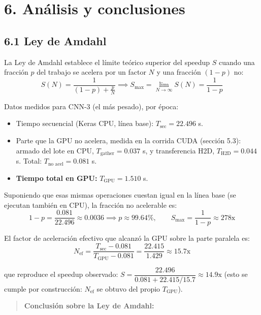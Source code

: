 \documentclass[
  11pt,
]{article}
\providecommand{\tightlist}{%
  \setlength{\itemsep}{0pt}\setlength{\parskip}{0pt}}
\begin{document}
\clearpage
\section{6. Análisis y conclusiones}\label{anuxe1lisis-riguroso-y-conclusiones-paso-6}

\subsection{6.1 Ley de Amdahl}\label{anuxe1lisis-mediante-la-ley-de-amdahl}

La Ley de Amdahl establece el límite teórico superior del
speedup \(S\) cuando una fracción \(p\) del trabajo se
acelera por un factor \(N\) y una fracción \((1 - p)\) no:
\[S(N) = \frac{1}{(1 - p) + \frac{p}{N}} \implies S_{\max} = \lim_{N \to \infty} S(N) = \frac{1}{1 - p}\]

Datos medidos para CNN-3 (el más pesado), por época:

\begin{itemize}
\tightlist
\item
  Tiempo secuencial (Keras CPU, línea base):
  \(T_{\text{sec}} = 22.496\) s.
\item
  Parte que la GPU no acelera, medida en la corrida
  CUDA (sección 5.3): armado del lote en CPU,
  \(T_{\text{gather}} = 0.037\) s, y transferencia H2D,
  \(T_{\text{H2D}} = 0.044\) s. Total:
  \(T_{\text{no acel}} = 0.081\) s.
\item
  \textbf{Tiempo total en GPU:} \(T_{\text{GPU}} = 1.510\)
  s.
\end{itemize}

Suponiendo que esas mismas operaciones cuestan igual en la
línea base (se ejecutan también en CPU), la fracción no
acelerable es:
\[1 - p = \frac{0.081}{22.496} \approx 0.0036 \implies p \approx 99.64\%, \qquad S_{\max} = \frac{1}{1 - p} \approx 278\text{x}\]

El factor de aceleración efectivo que alcanzó la GPU sobre
la parte paralela es:
\[N_{\text{ef}} = \frac{T_{\text{sec}} - 0.081}{T_{\text{GPU}} - 0.081} = \frac{22.415}{1.429} \approx 15.7\text{x}\]

que reproduce el speedup observado:
\(S = \dfrac{22.496}{0.081 + 22.415 / 15.7} \approx 14.9\text{x}\)
(esto se cumple por construcción: \(N_{\text{ef}}\) se
obtuvo del propio \(T_{\text{GPU}}\)).

\begin{quote}
\textbf{Conclusión sobre la Ley de Amdahl:}
\end{quote}
\end{document}
